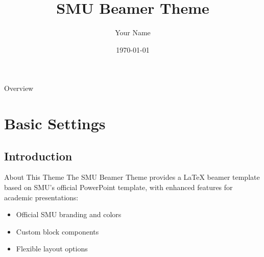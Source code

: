 \documentclass[10pt,aspectratio=1610]{beamer}
\title{SMU Beamer Theme}
\author{Your Name}
\institute[SMU]{School of Computing and Information Systems\\Singapore Management University}
\date{\today}
\begin{document}
\maketitle

\begin{frame}[allowframebreaks]{Overview}
    \tableofcontents
\end{frame}

\section{Basic Settings}

\subsection{Introduction}

\begin{frame}{About This Theme}
    The SMU Beamer Theme provides a LaTeX beamer template based on SMU's official PowerPoint template, with enhanced features for academic presentations:
    \begin{itemize}
        \item Official SMU branding and colors
        \item Custom block components
        \item Flexible layout options
    \end{itemize}
\end{frame}
\end{document}
